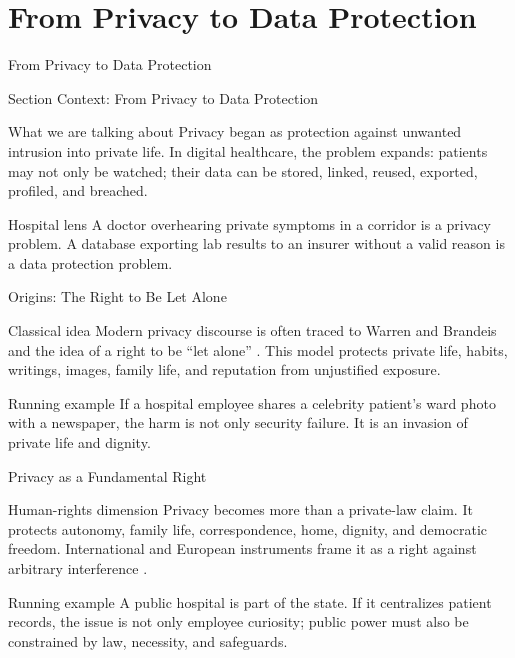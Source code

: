 \documentclass[presentation]{beamer}
\newcommand{\sectiontitleframe}[1]{
\begin{frame}[plain,c]
\begin{center}
{\usebeamerfont{title}\usebeamercolor[fg]{title}#1}
\end{center}
\end{frame}
}
\begin{document}
\section{From Privacy to Data Protection}
\sectiontitleframe{From Privacy to Data Protection}

\begin{frame}[c]{Section Context: From Privacy to Data Protection}
\begin{block}{What we are talking about}
Privacy began as protection against unwanted intrusion into private life. In digital healthcare, the
problem expands: patients may not only be watched; their data can be stored, linked, reused,
exported, profiled, and breached.
\end{block}

\begin{exampleblock}{Hospital lens}
A doctor overhearing private symptoms in a corridor is a privacy problem. A database exporting lab
results to an insurer without a valid reason is a data protection problem.
\end{exampleblock}
\end{frame}

\begin{frame}[c]{Origins: The Right to Be Let Alone}
\begin{block}{Classical idea}
Modern privacy discourse is often traced to Warren and Brandeis and the idea of a right to be
``let alone'' \cite{warren_brandeis}. This model protects private life, habits, writings, images,
family life, and reputation from unjustified exposure.
\end{block}

\begin{exampleblock}{Running example}
If a hospital employee shares a celebrity patient's ward photo with a newspaper, the harm is not
only security failure. It is an invasion of private life and dignity.
\end{exampleblock}
\end{frame}

\begin{frame}[c]{Privacy as a Fundamental Right}
\begin{block}{Human-rights dimension}
Privacy becomes more than a private-law claim. It protects autonomy, family life, correspondence,
home, dignity, and democratic freedom. International and European instruments frame it as a right
against arbitrary interference \cite{udhr,echr}.
\end{block}

\begin{exampleblock}{Running example}
A public hospital is part of the state. If it centralizes patient records, the issue is not only
employee curiosity; public power must also be constrained by law, necessity, and safeguards.
\end{exampleblock}
\end{frame}
\end{document}
